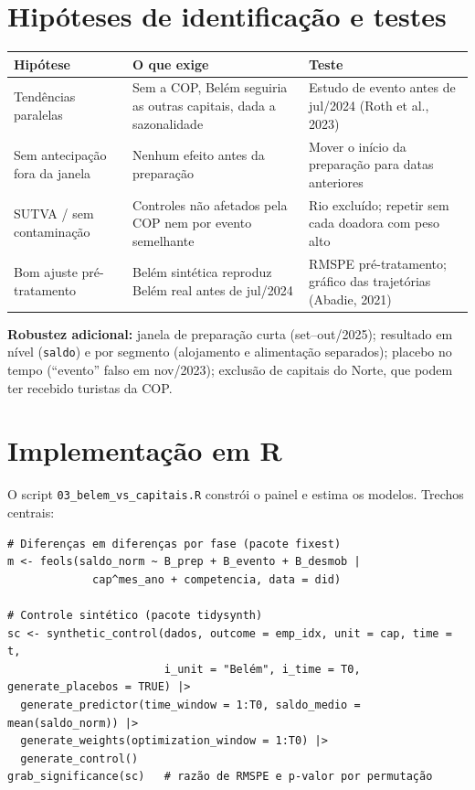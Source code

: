 \documentclass[11pt,a4paper]{article}
\newcommand{\var}[1]{\texttt{#1}}
\begin{document}
\section{Hipóteses de identificação e testes}

\begin{table}[H]
\centering\small
\begin{tabularx}{\linewidth}{p{3cm}LL}
\toprule
\textbf{Hipótese} & \textbf{O que exige} & \textbf{Teste}\\
\midrule
Tendências paralelas & Sem a COP, Belém seguiria as outras capitais, dada a sazonalidade & Estudo de evento antes de jul/2024 (Roth et al., 2023)\\
Sem antecipação fora da janela & Nenhum efeito antes da preparação & Mover o início da preparação para datas anteriores\\
SUTVA / sem contaminação & Controles não afetados pela COP nem por evento semelhante & Rio excluído; repetir sem cada doadora com peso alto\\
Bom ajuste pré-tratamento & Belém sintética reproduz Belém real antes de jul/2024 & RMSPE pré-tratamento; gráfico das trajetórias (Abadie, 2021)\\
\bottomrule
\end{tabularx}
\end{table}

\textbf{Robustez adicional:} janela de preparação curta (set--out/2025); resultado em nível
(\var{saldo}) e por segmento (alojamento e alimentação separados); placebo no tempo (``evento'' falso em
nov/2023); exclusão de capitais do Norte, que podem ter recebido turistas da COP.

\section{Implementação em R}

O script \texttt{03\_belem\_vs\_capitais.R} constrói o painel e estima os modelos. Trechos centrais:

\begin{lstlisting}
# Diferenças em diferenças por fase (pacote fixest)
m <- feols(saldo_norm ~ B_prep + B_evento + B_desmob |
             cap^mes_ano + competencia, data = did)

# Controle sintético (pacote tidysynth)
sc <- synthetic_control(dados, outcome = emp_idx, unit = cap, time = t,
                        i_unit = "Belém", i_time = T0, generate_placebos = TRUE) |>
  generate_predictor(time_window = 1:T0, saldo_medio = mean(saldo_norm)) |>
  generate_weights(optimization_window = 1:T0) |>
  generate_control()
grab_significance(sc)   # razão de RMSPE e p-valor por permutação
\end{lstlisting}
\end{document}
